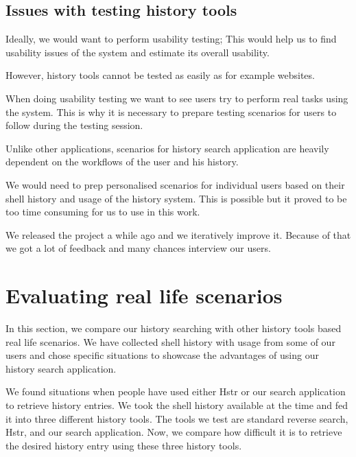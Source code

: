 
\subsection{Issues with testing history tools}



Ideally, we would want to perform usability testing; This would help us to find usability issues of the system and estimate its overall usability.

However, history tools cannot be tested as easily as for example websites.

When doing usability testing we want to see users try to perform real tasks using the system. This is why it is necessary to prepare testing scenarios for users to follow during the testing session.

Unlike other applications, scenarios for history search application are heavily dependent on the workflows of the user and his history.


We would need to prep personalised scenarios for individual users based on their shell history and usage of the history system.
This is possible but it proved to be too time consuming for us to use in this work.


We released the project a while ago and we iteratively improve it. Because of that we got a lot of feedback and many chances interview our users. 


\section{Evaluating real life scenarios}

In this section, we compare our history searching with other history tools based real life scenarios. We have collected shell history with usage from some of our users and chose specific situations to showcase the advantages of using our history search application.

We found situations when people have used either Hstr\cite{toolshstr} or our search application to retrieve history entries. We took the shell history available at the time and fed it into three different history tools. The tools we test are standard reverse search, Hstr, and our search application. Now, we compare how difficult it is to retrieve the desired history entry using these three history tools.


